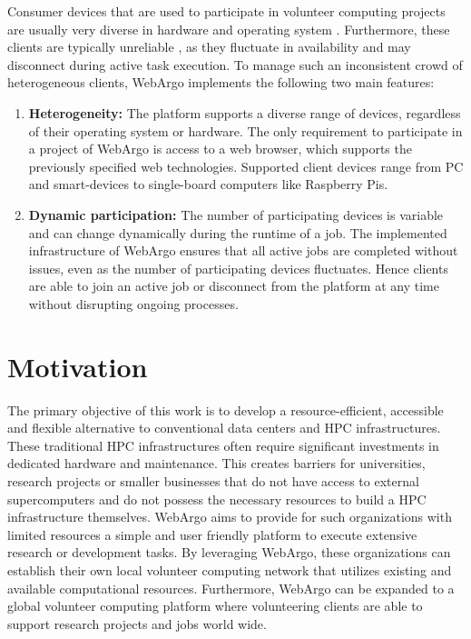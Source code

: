 Consumer devices that are used to participate in volunteer computing projects are usually very diverse in hardware and operating system \cite{intro:diverseDevices}. Furthermore, these clients are typically unreliable \cite{relatedwork:boinc1}, as they fluctuate in availability and may disconnect during active task execution. To manage such an inconsistent crowd of heterogeneous clients, WebArgo implements the following two main features:
\begin{enumerate}
    \item \textbf{Heterogeneity:} The platform supports a diverse range of devices, regardless of their operating system or hardware. The only requirement to participate in a project of WebArgo is access to a web browser, which supports the previously specified web technologies. Supported client devices range from \ac{PC} and smart-devices to single-board computers like Raspberry Pis.
    \item \textbf{Dynamic participation:} The number of participating devices is variable and can change dynamically during the runtime of a job. The implemented infrastructure of WebArgo ensures that all active jobs are completed without issues, even as the number of participating devices fluctuates. Hence clients are able to join an active job or disconnect from the platform at any time without disrupting ongoing processes.
\end{enumerate}

\section{Motivation}
\label{sec:intro:motivation}
The primary objective of this work is to develop a resource-efficient, accessible and flexible alternative to conventional data centers and \ac{HPC} infrastructures. These traditional \ac{HPC} infrastructures often require significant investments in dedicated hardware and maintenance. This creates barriers for universities, research projects or smaller businesses that do not have access to external supercomputers and do not possess the necessary resources to build a \ac{HPC} infrastructure themselves. WebArgo aims to provide for such organizations with limited resources a simple and user friendly platform to execute extensive research or development tasks. By leveraging WebArgo, these organizations can establish their own local volunteer computing network that utilizes existing and available computational resources. Furthermore, WebArgo can be expanded to a global volunteer computing platform where volunteering clients are able to support research projects and jobs world wide.

